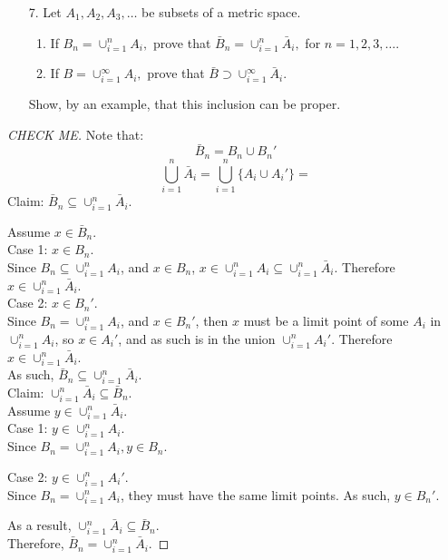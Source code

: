 \documentclass[10pt]{article}
\theoremstyle{definition}
\theoremstyle{plain}
\begin{document}
\pagebreak



\begin{enumerate}
\item[7.] Let $A_1,A_2,A_3,\dots$ be subsets of a metric space.
\begin{enumerate}
  \item If $B_n = \cup_{i=1}^{n} A_i,$ prove that $\bar{B}_n = \cup_{i=1}^{n} \bar{A}_i,$ for $n=1,2,3,\dots$.
  \item If $B = \cup_{i=1}^{\infty} A_i,$ prove that $\bar{B} \supset \cup_{i=1}^{\infty} \bar{A}_i.$
\end{enumerate}
Show, by an example, that this inclusion can be proper.
\end{enumerate}

\begin{proof}[CHECK ME]
Note that:
$$\bar{B}_n = B_n \cup B_n'$$
$$\bigcup_{i=1}^n \bar{A}_i = \bigcup_{i=1}^n \{A_i \cup A_i'\} = $$
Claim: $\bar{B}_n \subseteq \cup_{i=1}^{n} \bar{A}_i$.

Assume $x\in \bar{B}_n$. \\

Case 1: $x\in B_n$. \\

Since $B_n \subseteq \cup_{i=1}^n A_i$, and $x\in B_n$, $x\in \cup_{i=1}^n A_i \subseteq \cup_{i=1}^n \bar{A}_i$. Therefore $x\in\cup_{i=1}^n \bar{A}_i$. \\

Case 2: $x\in B_n'$. \\

Since $B_n = \cup_{i=1}^n A_i$, and $x\in B_n'$, then $x$ must be a limit point of some $A_i$ in $\cup_{i=1}^n A_i$, so $x\in A_i'$, and as such is in the union $\cup_{i=1}^n A_i'$. Therefore $x\in\cup_{i=1}^n \bar{A}_i$. \\

As such, $\bar{B}_n \subseteq \cup_{i=1}^{n} \bar{A}_i$. \\

Claim: $\cup_{i=1}^{n} \bar{A}_i \subseteq \bar{B}_n$. \\

Assume $y\in\cup_{i=1}^{n} \bar{A}_i$. \\

Case 1: $y\in\cup_{i=1}^{n} A_i$. \\

Since $B_n = \cup_{i=1}^{n} A_i, y\in B_n$.

Case 2: $y\in\cup_{i=1}^{n} A_i'$. \\

Since $B_n = \cup_{i=1}^{n} A_i$, they must have the same limit points. As such, $y\in B_n'$.

As a result, $\cup_{i=1}^{n} \bar{A}_i \subseteq \bar{B}_n$. \\

Therefore, $\bar{B}_n = \cup_{i=1}^{n} \bar{A}_i$.
\end{proof}
\end{document}
